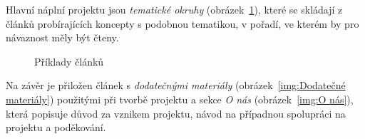 \documentclass[a4paper, 12pt, twoside]{article}
\begin{document}
  Hlavní náplní projektu jsou \emph{tematické okruhy} (obrázek~\ref{img:Příklady článků}), které se skládají z článků probírajících koncepty s podobnou tematikou, v pořadí, ve kterém by pro návaznost měly být čteny.

  \begin{figure}[H]
    \centering

    \hfill
    \hfill

    \caption{Příklady článků}%
    \label{img:Příklady článků}%
  \end{figure}

  Na závěr je přiložen článek s \emph{dodatečnými materiály} (obrázek~\ref{img:Dodatečné materiály}) použitými při tvorbě projektu a sekce \emph{O nás} (obrázek~\ref{img:O nás}), která popisuje důvod za vznikem projektu, návod na případnou spolupráci na projektu a poděkování.
\end{document}
